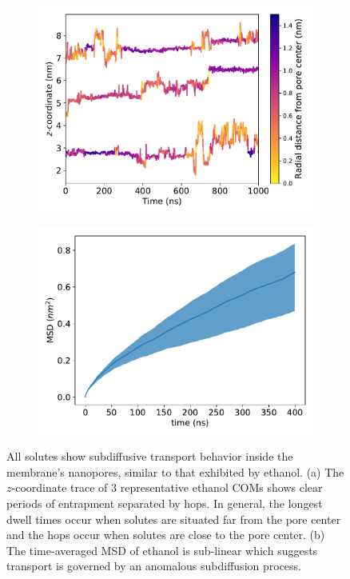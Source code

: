 \documentclass{article}
\begin{document}
  \begin{figure}[!htb]
  \centering
  \begin{subfigure}{0.49\textwidth}
  \includegraphics[width=\linewidth]{colorful_example_ztraces.pdf}
  \caption{}\label{fig:example_ztraces}
  \end{subfigure}
  \begin{subfigure}{0.49\textwidth}
  \includegraphics[width=\linewidth]{example_msd.pdf}
  \caption{}\label{fig:example_msd}
  \end{subfigure}
  \caption{All solutes show subdiffusive transport behavior inside the membrane's
  nanopores, similar to that exhibited by ethanol. (a) The $z$-coordinate trace of
  3 representative ethanol COMs shows clear periods of entrapment separated by hops.
  In general, the longest dwell times occur when solutes are situated far from the
  pore center and the hops occur when solutes are close to the pore center. (b) The
  time-averaged MSD of ethanol is sub-linear which suggests transport is governed
  by an anomalous subdiffusion process.}\label{fig:qualitative_mechanisms}
  \end{figure}
  
\end{document}
